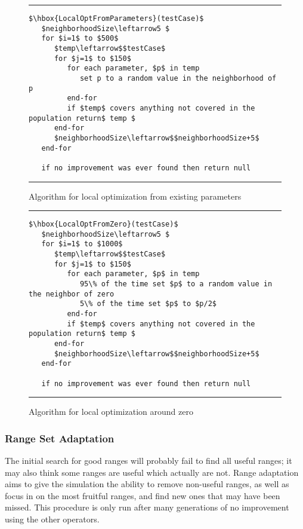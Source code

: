 \documentclass[runningheads]{llncs}
\begin{document}
\begin{figure}[h!]
	\begin{center}
		\hrule
		\medskip
		\begin{Verbatim}[fontfamily=tt, xleftmargin=10pt, commandchars=\\\{\},
		codes={\catcode`$=3\catcode`^=7\catcode`_=8}]
$\hbox{LocalOptFromParameters}(testCase)$
   $neighborhoodSize\leftarrow5 $
   for $i=1$ to $500$ 
      $temp\leftarrow$$testCase$
      for $j=1$ to $150$
         for each parameter, $p$ in temp
            set p to a random value in the neighborhood of p
         end-for     
         if $temp$ covers anything not covered in the population return$ temp $
      end-for
      $neighborhoodSize\leftarrow$$neighborhoodSize+5$
   end-for

   if no improvement was ever found then return null
		\end{Verbatim}
		\hrule
	\end{center}
	\caption{Algorithm for local optimization from existing parameters \label{fig:lcOptFP}}
\end{figure}
\begin{figure}[h!]
\begin{center}
\hrule
\medskip
\begin{Verbatim}[fontfamily=tt, xleftmargin=10pt, commandchars=\\\{\},
codes={\catcode`$=3\catcode`^=7\catcode`_=8}]
$\hbox{LocalOptFromZero}(testCase)$
   $neighborhoodSize\leftarrow5 $
   for $i=1$ to $1000$ 
      $temp\leftarrow$$testCase$
      for $j=1$ to $150$
         for each parameter, $p$ in temp
            95\% of the time set $p$ to a random value in the neighbor of zero
            5\% of the time set $p$ to $p/2$
         end-for     
         if $temp$ covers anything not covered in the population return$ temp $
      end-for
      $neighborhoodSize\leftarrow$$neighborhoodSize+5$
   end-for
		
   if no improvement was ever found then return null
\end{Verbatim}
\hrule
\end{center}
\caption{Algorithm for local optimization around zero \label{fig:lcOptFZ}}
\end{figure}
\FloatBarrier


\subsubsection{Range Set Adaptation} The initial search for good ranges will probably fail to find all useful ranges; it may also think some ranges are useful which actually are not. Range adaptation aims to give the simulation the ability to remove non-useful ranges, as well as focus in on the most fruitful ranges, and find new ones that may have been missed. This procedure is only run after many generations of no improvement using the other operators.
\end{document}
